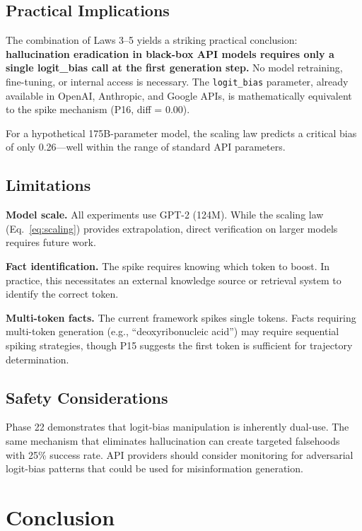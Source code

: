 \documentclass[11pt,a4paper]{article}
\begin{document}
\subsection{Practical Implications}

The combination of Laws 3--5 yields a striking practical conclusion: \textbf{hallucination eradication in black-box API models requires only a single logit\_bias call at the first generation step.} No model retraining, fine-tuning, or internal access is necessary. The \texttt{logit\_bias} parameter, already available in OpenAI, Anthropic, and Google APIs, is mathematically equivalent to the spike mechanism (P16, diff = 0.00).

For a hypothetical 175B-parameter model, the scaling law predicts a critical bias of only 0.26---well within the range of standard API parameters.

\subsection{Limitations}

\textbf{Model scale.} All experiments use GPT-2 (124M). While the scaling law (Eq.~\ref{eq:scaling}) provides extrapolation, direct verification on larger models requires future work.

\textbf{Fact identification.} The spike requires knowing which token to boost. In practice, this necessitates an external knowledge source or retrieval system to identify the correct token.

\textbf{Multi-token facts.} The current framework spikes single tokens. Facts requiring multi-token generation (e.g., ``deoxyribonucleic acid'') may require sequential spiking strategies, though P15 suggests the first token is sufficient for trajectory determination.

\subsection{Safety Considerations}

Phase 22 demonstrates that logit-bias manipulation is inherently dual-use. The same mechanism that eliminates hallucination can create targeted falsehoods with 25\% success rate. API providers should consider monitoring for adversarial logit-bias patterns that could be used for misinformation generation.

\section{Conclusion}
\end{document}
